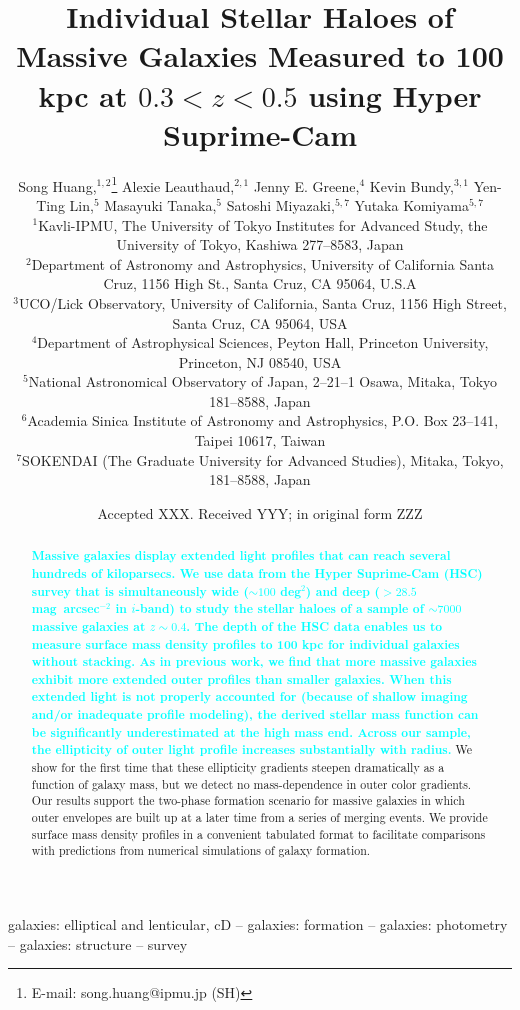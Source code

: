 \documentclass[fleqn,usenatbib]{mnras}
\title[Mass Dependent Stellar Haloes in Massive Galaxies]{Individual Stellar Haloes of 
	   Massive Galaxies Measured to 100 kpc at $0.3<z<0.5$ using Hyper Suprime-Cam}
\author[S. Huang et al.]{
        Song Huang,$^{1,2}$\thanks{E-mail: song.huang@ipmu.jp (SH)}
        Alexie Leauthaud,$^{2,1}$
        Jenny E. Greene,$^{4}$
        Kevin Bundy,$^{3,1}$
        \newauthor
        Yen-Ting Lin,$^{5}$
        Masayuki Tanaka,$^{5}$
        Satoshi Miyazaki,$^{5,7}$
        \newauthor
        Yutaka Komiyama$^{5,7}$
        \\
        $^{1}$Kavli-IPMU, The University of Tokyo Institutes for Advanced Study, 
              the University of Tokyo, Kashiwa 277--8583, Japan\\
        $^{2}$Department of Astronomy and Astrophysics, University of California 
              Santa Cruz, 1156 High St., Santa Cruz, CA 95064, U.S.A\\
        $^{3}$UCO/Lick Observatory, University of California, Santa Cruz,
              1156 High Street, Santa Cruz, CA 95064, USA\\
        $^{4}$Department of Astrophysical Sciences, Peyton Hall,
              Princeton University, Princeton, NJ 08540, USA \\
        $^{5}$National Astronomical Observatory of Japan, 2--21--1 Osawa, Mitaka, 
              Tokyo 181--8588, Japan\\
        $^{6}$Academia Sinica Institute of Astronomy and Astrophysics, 
              P.O. Box 23--141, Taipei 10617, Taiwan\\
        $^{7}$SOKENDAI (The Graduate University for Advanced Studies), Mitaka,
              Tokyo, 181--8588, Japan
        }
\date{Accepted XXX. Received YYY; in original form ZZZ}
\def\sb{mag~arcsec$^{-2}$}
\newcommand{\song}[1]{\textcolor{cyan}{\textbf{#1}}}
\begin{document}
\label{firstpage}
\pagerange{\pageref{firstpage}--\pageref{lastpage}}

\maketitle


\begin{abstract} 

    \song{
    Massive galaxies display extended light profiles that can reach several 
    hundreds of kiloparsecs. 
    We use data from the Hyper Suprime-Cam (HSC) survey that is simultaneously wide 
    (${\sim}100$ deg$^2$) and deep ($>28.5$ \sb{} in $i$-band) to study the stellar 
    haloes of a sample of ${\sim}7000$ massive galaxies at $z{\sim}0.4$. 
    The depth of the HSC data enables us to measure surface mass density profiles 
    to 100 kpc for individual galaxies without stacking. 
    As in previous work, we find that more massive galaxies exhibit more extended outer 
    profiles than smaller galaxies.  
    When this extended light is not properly accounted for (because of shallow imaging 
    and/or inadequate profile modeling), the derived stellar mass function can be 
    significantly underestimated at the high mass end.  
    Across our sample, the ellipticity of outer light profile increases substantially 
    with radius.  
    }
    We show for the first time that these ellipticity gradients steepen dramatically as 
    a function of galaxy mass, but we detect no mass-dependence in outer color gradients. 
    Our results support the two-phase formation scenario for massive galaxies in which 
    outer envelopes are built up at a later time from a series of merging events. 
    We provide surface mass density profiles in a convenient tabulated format 
    to facilitate comparisons with predictions from numerical simulations of 
    galaxy formation.
    
\end{abstract}


\begin{keywords}
    galaxies: elliptical and lenticular, cD --
    galaxies: formation --
    galaxies: photometry -- 
    galaxies: structure -- 
    survey 
\end{keywords}

\end{document}
